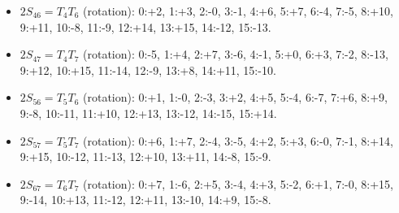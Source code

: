 \documentclass[
  10pt,
]{article}
\begin{document}
\begin{itemize}
  6:-5, 7:+4, 8:-11, 9:+10, 10:-9, 11:+8, 12:-15, 13:+14, 14:-13,
  15:+12.
\item
  \(2S_{46} = T_4T_6\) (rotation): 0:+2, 1:+3, 2:-0, 3:-1, 4:+6, 5:+7,
  6:-4, 7:-5, 8:+10, 9:+11, 10:-8, 11:-9, 12:+14, 13:+15, 14:-12,
  15:-13.
\item
  \(2S_{47} = T_4T_7\) (rotation): 0:-5, 1:+4, 2:+7, 3:-6, 4:-1, 5:+0,
  6:+3, 7:-2, 8:-13, 9:+12, 10:+15, 11:-14, 12:-9, 13:+8, 14:+11,
  15:-10.
\item
  \(2S_{56} = T_5T_6\) (rotation): 0:+1, 1:-0, 2:-3, 3:+2, 4:+5, 5:-4,
  6:-7, 7:+6, 8:+9, 9:-8, 10:-11, 11:+10, 12:+13, 13:-12, 14:-15,
  15:+14.
\item
  \(2S_{57} = T_5T_7\) (rotation): 0:+6, 1:+7, 2:-4, 3:-5, 4:+2, 5:+3,
  6:-0, 7:-1, 8:+14, 9:+15, 10:-12, 11:-13, 12:+10, 13:+11, 14:-8,
  15:-9.
\item
  \(2S_{67} = T_6T_7\) (rotation): 0:+7, 1:-6, 2:+5, 3:-4, 4:+3, 5:-2,
  6:+1, 7:-0, 8:+15, 9:-14, 10:+13, 11:-12, 12:+11, 13:-10, 14:+9,
  15:-8.
\end{itemize}
\end{document}
